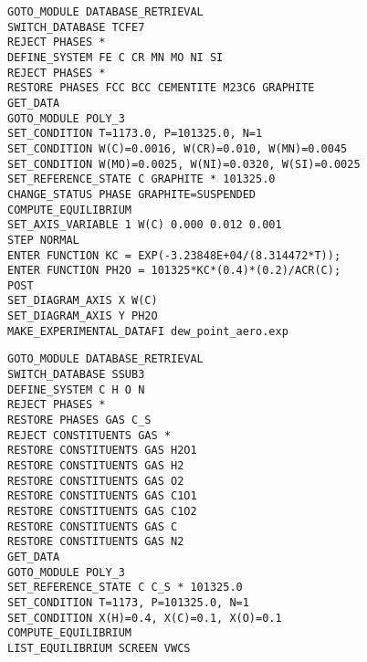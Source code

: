 \newpage

\begin{lstlisting}[caption={\label{lst:gaz-solide}Calcul de l'équilibre gaz-solide.}]
GOTO_MODULE DATABASE_RETRIEVAL
SWITCH_DATABASE TCFE7
REJECT PHASES *
DEFINE_SYSTEM FE C CR MN MO NI SI
REJECT PHASES *
RESTORE PHASES FCC BCC CEMENTITE M23C6 GRAPHITE 
GET_DATA
GOTO_MODULE POLY_3
SET_CONDITION T=1173.0, P=101325.0, N=1
SET_CONDITION W(C)=0.0016, W(CR)=0.010, W(MN)=0.0045
SET_CONDITION W(MO)=0.0025, W(NI)=0.0320, W(SI)=0.0025
SET_REFERENCE_STATE C GRAPHITE * 101325.0
CHANGE_STATUS PHASE GRAPHITE=SUSPENDED
COMPUTE_EQUILIBRIUM
SET_AXIS_VARIABLE 1 W(C) 0.000 0.012 0.001
STEP NORMAL
ENTER FUNCTION KC = EXP(-3.23848E+04/(8.314472*T));
ENTER FUNCTION PH2O = 101325*KC*(0.4)*(0.2)/ACR(C);
POST
SET_DIAGRAM_AXIS X W(C)
SET_DIAGRAM_AXIS Y PH2O
MAKE_EXPERIMENTAL_DATAFI dew_point_aero.exp
\end{lstlisting}

\begin{lstlisting}[caption={\label{lst:point-de-rosee}Calcul de l'équilibre gaz-solide à la température de cémentation (\SI{1173}{\kelvin}) pour la determination de la fraction molaire de \ch{H2O} et calcul de la température de point de rosée.}]
GOTO_MODULE DATABASE_RETRIEVAL
SWITCH_DATABASE SSUB3
DEFINE_SYSTEM C H O N
REJECT PHASES *
RESTORE PHASES GAS C_S
REJECT CONSTITUENTS GAS *
RESTORE CONSTITUENTS GAS H2O1
RESTORE CONSTITUENTS GAS H2
RESTORE CONSTITUENTS GAS O2
RESTORE CONSTITUENTS GAS C1O1
RESTORE CONSTITUENTS GAS C1O2
RESTORE CONSTITUENTS GAS C
RESTORE CONSTITUENTS GAS N2
GET_DATA
GOTO_MODULE POLY_3
SET_REFERENCE_STATE C C_S * 101325.0
SET_CONDITION T=1173, P=101325.0, N=1
SET_CONDITION X(H)=0.4, X(C)=0.1, X(O)=0.1
COMPUTE_EQUILIBRIUM
LIST_EQUILIBRIUM SCREEN VWCS
\end{lstlisting}

\newpage

